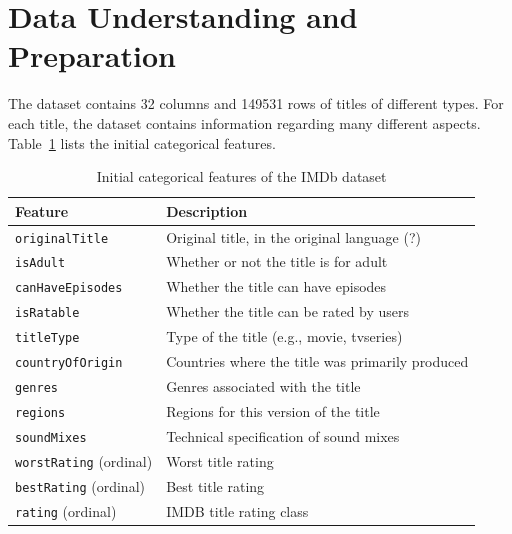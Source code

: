\section{Data Understanding and Preparation}
The dataset contains 32 columns and 149531 rows of titles of different types.
For each title, the dataset contains information regarding many different
aspects. Table~\ref{tab:initial_categorical_features} lists the initial categorical
features.
\begin{table}[H]
    \centering
    \begin{tabular}{|p{4cm}|p{9cm}|}

        \hline
        \textbf{Feature} & \textbf{Description} \\ \hline
        \texttt{originalTitle} & Original title, in the original language (?) \\ \hline
        \texttt{isAdult} & Whether or not the title is for adult \\ \hline
        \texttt{canHaveEpisodes} & Whether the title can have episodes \\ \hline
        \texttt{isRatable} & Whether the title can be rated by users \\ \hline
        \texttt{titleType} & Type of the title (e.g., movie, tvseries) \\ \hline
        \texttt{countryOfOrigin} & Countries where the title was primarily produced \\ \hline
        \texttt{genres} & Genres associated with the title \\ \hline
        \texttt{regions} & Regions for this version of the title \\ \hline
        \texttt{soundMixes} & Technical specification of sound mixes \\ \hline
        \texttt{worstRating} (ordinal) & Worst title rating \\ \hline
        \texttt{bestRating} (ordinal) & Best title rating \\ \hline
        \texttt{rating} (ordinal) & IMDB title rating class \\ \hline
    \end{tabular}
    \caption{Initial categorical features of the IMDb dataset}
    \label{tab:initial_categorical_features}
\end{table}


